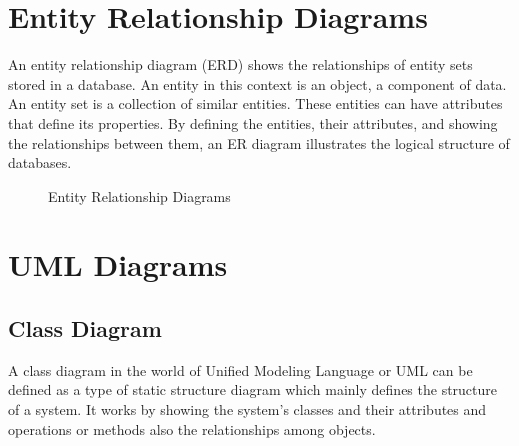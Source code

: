 \documentclass[oneside,a4paper,12pt]{report}
\begin{document}
\newpage
\section{Entity Relationship Diagrams}
\hspace*{0.5cm} An entity relationship diagram (ERD) shows the relationships of entity sets stored in a database. An entity in this context is an object, a component of data. An entity set is a collection of similar entities. These entities can have attributes that define its properties. By defining the entities, their attributes, and showing the relationships between them, an ER diagram illustrates the logical structure of databases.

\begin{center}
	\begin{figure}[!htbp]
		\centering
  	    \caption{Entity Relationship Diagrams}
	    \label{fig:Entity Relationship Diagrams}
	\end{figure}
\end{center} 

\newpage
\section{UML Diagrams}
\subsection{Class Diagram}
\hspace*{0.5cm} A class diagram in the world of Unified Modeling Language or UML can be defined as a type of static structure diagram which mainly defines the structure of a system. It works by showing the system’s classes and their attributes and operations or methods also the relationships among objects.
\end{document}
